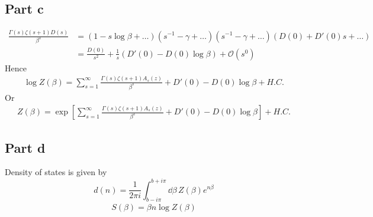 \documentclass[a4paper,12pt]{article}
\begin{document}
\subsection*{Part c}
\begin{equation}
	\begin{aligned}
		\frac{\Gamma(s)\zeta(s+1)D(s)}{\beta^{s}}&=(1-s\log \beta+\dots)(s^{-1}-\gamma+\dots)(s^{-1}-\gamma+\dots)(D(0)+D'(0)s+\dots)
		\\&=\frac{D(0)}{s^2}+\frac{1}{s}(D'(0)-D(0)\log \beta)+\mathcal{O}(s^{0})
	\end{aligned}
\end{equation}
Hence
\begin{equation}
\begin{aligned}
\log Z(\beta)=\sum_{s=1}^{\infty}\frac{\Gamma(s)\zeta(s+1)A_s(z)}{\beta^{s}}+	D'(0)-D(0)\log \beta+H.C.
\end{aligned}
\end{equation}
Or
\begin{equation}
	\begin{aligned}
 Z(\beta)=\exp[\sum_{s=1}^{\infty}\frac{\Gamma(s)\zeta(s+1)A_s(z)}{\beta^{s}}+	D'(0)-D(0)\log \beta]+H.C.
	\end{aligned}
\end{equation}
\subsection*{Part d}
Density of states is given by
\begin{equation}
d(n)=\frac{1}{2\pi i}\int_{b-i\pi}^{b+i\pi}\dd \beta\,Z(\beta)e^{n\beta}
\end{equation}
\begin{equation}
	\begin{aligned}
		S(\beta)=\beta n \log Z(\beta)
	\end{aligned}
\end{equation}
\end{document}
